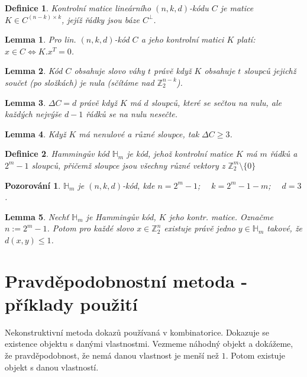 \documentclass[a4paper,10pt,titlepage]{article} \usepackage[utf8]{inputenc}
\newtheorem{define}{Definice}
\newtheorem*{observ}{Pozorování}
\newtheorem*{lemma}{Lemma}
\begin{document}
\begin{define}
Kontrolní matice lineárního $(n,k,d)$-kódu $C$ je matice $K \in C^{(n-k) \times k}$, jejíž řádky jsou báze $C^\bot$.
\end{define}

\begin{lemma}
Pro lin. $(n,k,d)$-kód $C$ a jeho kontrolní matici $K$ platí: $x \in C \Longleftrightarrow K.x^T = 0$.
\end{lemma}

\begin{lemma}
Kód $C$ obsahuje slovo váhy $t$ právě když $K$ obsahuje $t$ sloupců jejichž součet (po složkách) je nula (sčítáme nad $\mathbb{Z}^{n-k}_2$).
\end{lemma}

\begin{lemma}
$\Delta C = d$ právě když $K$ má $d$ sloupců, které se sečtou na nulu, ale každých nejvýše $d-1$ řádků se na nulu nesečte.
\end{lemma}

\begin{lemma}
Když $K$ má nenulové a různé sloupce, tak $\Delta C \geq 3$.
\end{lemma}

\begin{define}
Hammingův kód $\mathbb{H}_m$ je kód, jehož kontrolní matice $K$ má $m$ řádků a $2^m-1$ sloupců, přičemž sloupce jsou všechny různé vektory z $\mathbb{Z}^{m}_2 \setminus \{0\}$
\end{define}

\begin{observ}
$\mathbb{H}_m$ je $(n,k,d)$-kód, kde $n=2^m-1$; $\quad k=2^m-1-m$; $\quad d=3$.
\end{observ}

\begin{lemma}
Nechť $\mathbb{H}_m$ je Hammingův kód, $K$ jeho kontr. matice. Označme $n := 2^m-1$. Potom pro každé slovo $x \in \mathbb{Z}^{n}_2$ existuje právě jedno $y \in \mathbb{H}_m$ takové, že $d(x,y) \leq 1$.
\end{lemma}

\medskip

\section{Pravděpodobnostní metoda - příklady použití}

Nekonstruktivní metoda dokazů používaná v kombinatorice.
Dokazuje se existence objektu s danými vlastnostmi.
Vezmeme náhodný objekt a dokážeme, že pravděpodobnost, že nemá danou vlastnost je menší než $1$.
Potom existuje objekt s danou vlastností.
\end{document}
